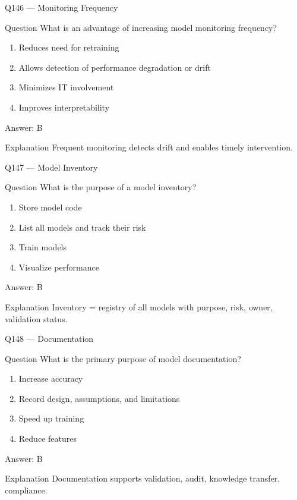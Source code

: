 \documentclass[aspectratio=169,8pt]{beamer}
\begin{document}
	\begin{frame}{Q146 --- Monitoring Frequency}
		\begin{block}{Question}
			What is an advantage of increasing model monitoring frequency?
		\end{block}
		\begin{enumerate}
			\item Reduces need for retraining
			\item Allows detection of performance degradation or drift
			\item Minimizes IT involvement
			\item Improves interpretability
		\end{enumerate}
		\begin{exampleblock}{Answer: B}\end{exampleblock}
		\begin{block}{Explanation}
			Frequent monitoring detects drift and enables timely intervention.
		\end{block}
	\end{frame}
	
	\begin{frame}{Q147 --- Model Inventory}
		\begin{block}{Question}
			What is the purpose of a model inventory?
		\end{block}
		\begin{enumerate}
			\item Store model code
			\item List all models and track their risk
			\item Train models
			\item Visualize performance
		\end{enumerate}
		\begin{exampleblock}{Answer: B}\end{exampleblock}
		\begin{block}{Explanation}
			Inventory = registry of all models with purpose, risk, owner, validation status.
		\end{block}
	\end{frame}
	
	\begin{frame}{Q148 --- Documentation}
		\begin{block}{Question}
			What is the primary purpose of model documentation?
		\end{block}
		\begin{enumerate}
			\item Increase accuracy
			\item Record design, assumptions, and limitations
			\item Speed up training
			\item Reduce features
		\end{enumerate}
		\begin{exampleblock}{Answer: B}\end{exampleblock}
		\begin{block}{Explanation}
			Documentation supports validation, audit, knowledge transfer, compliance.
		\end{block}
	\end{frame}
	
\end{document}
